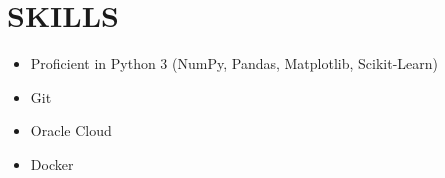 \documentclass[11pt,letterpaper]{article}
\begin{document}
\vspace{1em}
\section{SKILLS}

\vspace{0.5em}
\begin{itemize}[leftmargin=*,nosep]
  \item Proficient in Python 3 (NumPy, Pandas, Matplotlib, Scikit-Learn)
  \item Git
  \item Oracle Cloud 
  \item Docker 
\end{itemize}
\end{document}
